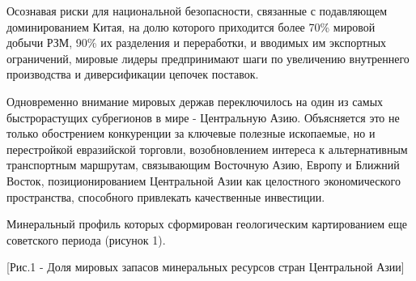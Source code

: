 \begin{multicols}{2}
Осознавая риски для национальной безопасности, связанные с подавляющем
доминированием Китая, на долю которого приходится более 70\% мировой
добычи РЗМ, 90\% их разделения и переработки, и вводимых им экспортных
ограничений, мировые лидеры предпринимают шаги по увеличению внутреннего
производства и диверсификации цепочек поставок.

\texorpdfstring{ Одновременно внимание мировых держав
переключилось на один из самых быстрорастущих субрегионов в мире -
Центральную Азию. Объясняется это не только обострением конкуренции за
ключевые полезные ископаемые, но и перестройкой евразийской торговли,
возобновлением интереса к альтернативным транспортным маршрутам,
связывающим Восточную Азию, Европу и Ближний Восток, позиционированием
Центральной Азии как целостного экономического пространства, способного
привлекать качественные инвестиции.
}{ Одновременно внимание мировых держав переключилось на один из самых быстрорастущих субрегионов в мире - Центральную Азию. Объясняется это не только обострением конкуренции за ключевые полезные ископаемые, но и перестройкой евразийской торговли, возобновлением интереса к альтернативным транспортным маршрутам, связывающим Восточную Азию, Европу и Ближний Восток, позиционированием Центральной Азии как целостного экономического пространства, способного привлекать качественные инвестиции. }

Минеральный профиль которых сформирован геологическим картированием еще
советского периода (рисунок 1).
\end{multicols}

[Рис.1 - Доля мировых запасов минеральных ресурсов стран
Центральной Азии]

